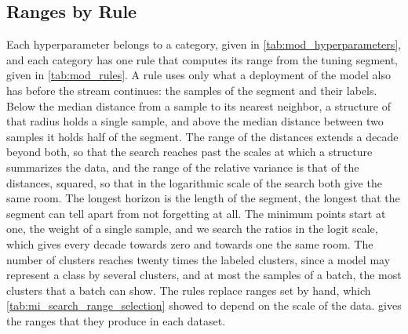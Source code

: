 \subsection{Ranges by Rule}
\label{subsec:mod_ranges}

Each hyperparameter belongs to a category, given in \cref{tab:mod_hyperparameters}, and each category has one rule that computes its range from the tuning segment, given in \cref{tab:mod_rules}. A rule uses only what a deployment of the model also has before the stream continues: the samples of the segment and their labels. Below the median distance from a sample to its nearest neighbor, a structure of that radius holds a single sample, and above the median distance between two samples it holds half of the segment. The range of the distances extends a decade beyond both, so that the search reaches past the scales at which a structure summarizes the data, and the range of the relative variance is that of the distances, squared, so that in the logarithmic scale of the search both give the same room. The longest horizon is the length of the segment, the longest that the segment can tell apart from not forgetting at all. The minimum points start at one, the weight of a single sample, and we search the ratios in the logit scale, which gives every decade towards zero and towards one the same room. The number of clusters reaches twenty times the labeled clusters, since a model may represent a class by several clusters, and at most the samples of a batch, the most clusters that a batch can show. The rules replace ranges set by hand, which \cref{tab:mi_search_range_selection} showed to depend on the scale of the data.  gives the ranges that they produce in each dataset.

